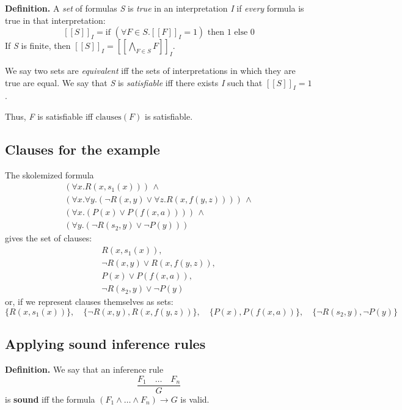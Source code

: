 \documentclass[11pt]{article}
\begin{document}
\begin{tcolorbox}[
    enhanced,
    frame hidden,
    borderline west={2pt}{0pt}{black},
    boxsep=5pt,
    left=8pt
]
\textbf{Definition.} A \textit{set} of formulas \textit{S} is \textit{true} in an interpretation \textit{I} if \textit{every} formula is true in that interpretation:
\[
    [\![S]\!]_I = \text{if } (\forall F \in S. [\![F]\!]_I = 1) \text{ then } 1 \text{ else } 0
\]
If \textit{S} is finite, then $[\![S]\!]_I = [\![ \bigwedge_{F \in S} F ]\!]_I$.

We say two sets are \textit{equivalent} iff the sets of interpretations in which they are true are equal. We say that \textit{S} is \textit{satisfiable} iff there exists \textit{I} such that $[\![S]\!]_I = 1$.
\end{tcolorbox}

Thus, \textit{F} is satisfiable iff $\mathrm{clauses}(F)$ is satisfiable.

\subsection*{Clauses for the example}

The skolemized formula
\[
\begin{align*}
    (\forall x. R(x, s_1(x))) \, \land \\
    (\forall x. \forall y. (\neg R(x, y) \lor \forall z. R(x, f(y, z)))) \, \land \\
    (\forall x. (P(x) \lor P(f(x, a)))) \, \land \\
    (\forall y. (\neg R(s_2, y) \lor \neg P(y)))
\end{align*}
\]
gives the set of clauses:
\[
\begin{array}{l}
    R(x, s_1(x)), \\[0.5em]
    \neg R(x, y) \lor R(x, f(y, z)), \\[0.5em]
    P(x) \lor P(f(x, a)), \\[0.5em]
    \neg R(s_2, y) \lor \neg P(y)
\end{array}
\]
or, if we represent clauses themselves as sets:
\[
    \{R(x, s_1(x))\}, \quad \{\neg R(x, y), R(x, f(y, z))\}, \quad \{P(x), P(f(x, a))\}, \quad \{\neg R(s_2, y), \neg P(y)\}
\]

\subsection*{Applying sound inference rules}

\begin{tcolorbox}[
    enhanced,
    frame hidden,
    borderline west={2pt}{0pt}{black},
    boxsep=5pt,
    left=8pt
]
\textbf{Definition.} We say that an inference rule
\[
    \frac{F_1 \quad \dots \quad F_n}{G}
\]
is \textbf{sound} iff the formula $(F_1 \land \dots \land F_n) \to G$ is valid.
\end{tcolorbox}
\end{document}
